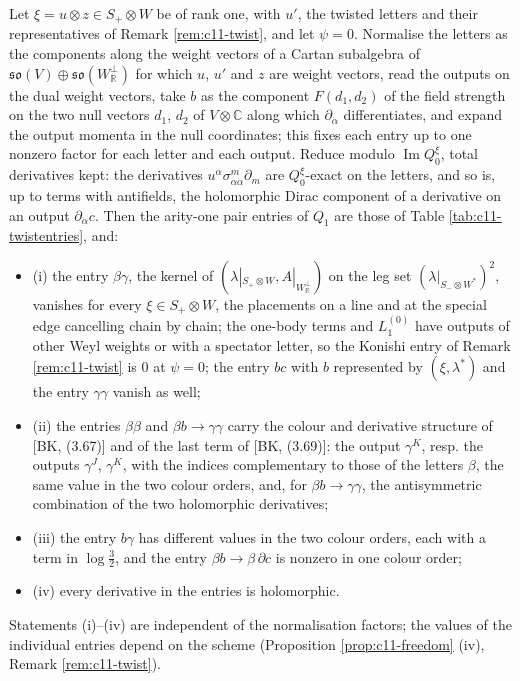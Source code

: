 \begin{theorem}
\label{thm:c11-twistentries}
Let $\xi=u\otimes z\in S_+\otimes W$ be of rank one, with $u'$, the twisted letters and their representatives of Remark \ref{rem:c11-twist}, and let $\psi=0$. Normalise the letters as the components along the weight vectors of a Cartan subalgebra of $\mathfrak{so}(V)\oplus\mathfrak{so}(W_{\mathbb R}^\perp)$ for which $u$, $u'$ and $z$ are weight vectors, read the outputs on the dual weight vectors, take $b$ as the component $F(d_1,d_2)$ of the field strength on the two null vectors $d_1$, $d_2$ of $V\otimes\mathbb C$ along which $\partial_{\dot\alpha}$ differentiates, and expand the output momenta in the null coordinates; this fixes each entry up to one nonzero factor for each letter and each output. Reduce modulo $\operatorname{Im}Q^\xi_0$, total derivatives kept: the derivatives $u^\alpha\sigma^m_{\alpha\dot\alpha}\partial_m$ are $Q^\xi_0$-exact on the letters, and so is, up to terms with antifields, the holomorphic Dirac component of a derivative on an output $\partial_{\dot\alpha}c$. Then the arity-one pair entries of $Q_1$ are those of Table \ref{tab:c11-twistentries}, and:
\begin{itemize}
\item (i) the entry $\beta\gamma$, the kernel of $(\lambda|_{S_+\otimes W},A|_{W_{\mathbb R}^\perp})$ on the leg set $(\lambda|_{S_-\otimes W^*})^2$, vanishes for every $\xi\in S_+\otimes W$, the placements on a line and at the special edge cancelling chain by chain; the one-body terms and $L_1^{(0)}$ have outputs of other Weyl weights or with a spectator letter, so the Konishi entry of Remark \ref{rem:c11-twist} is $0$ at $\psi=0$; the entry $bc$ with $b$ represented by $(\xi,\lambda^*)$ and the entry $\gamma\gamma$ vanish as well;
\item (ii) the entries $\beta\beta$ and $\beta b\to\gamma\gamma$ carry the colour and derivative structure of [BK, (3.67)] and of the last term of [BK, (3.69)]: the output $\gamma^K$, resp. the outputs $\gamma^J$, $\gamma^K$, with the indices complementary to those of the letters $\beta$, the same value in the two colour orders, and, for $\beta b\to\gamma\gamma$, the antisymmetric combination of the two holomorphic derivatives;
\item (iii) the entry $b\gamma$ has different values in the two colour orders, each with a term in $\log\tfrac32$, and the entry $\beta b\to\beta\,\partial c$ is nonzero in one colour order;
\item (iv) every derivative in the entries is holomorphic.
\end{itemize}
Statements (i)--(iv) are independent of the normalisation factors; the values of the individual entries depend on the scheme (Proposition \ref{prop:c11-freedom} (iv), Remark \ref{rem:c11-twist}).
\end{theorem}

